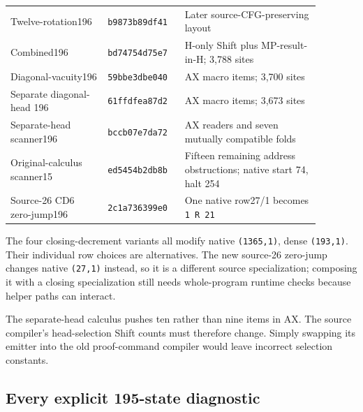 \begin{longtable}{@{}>{\raggedright\arraybackslash}p{0.29\linewidth}>{\raggedright\arraybackslash}p{0.2\linewidth}>{\raggedright\arraybackslash}p{0.39\linewidth}@{}}
Twelve-rotation196 & \nolinkurl{b9873b89df41} & Later source-CFG-preserving layout\\
Combined196 & \nolinkurl{bd74754d75e7} & H-only Shift plus MP-result-in-H; 3,788 sites\\
Diagonal-vacuity196 & \nolinkurl{59bbe3dbe040} & 191 AX macro items; 3,700 sites\\
Separate diagonal-head 196 & \nolinkurl{61ffdfea87d2} & 190 AX macro items; 3,673 sites\\
Separate-head scanner196 & \nolinkurl{bccb07e7da72} & 69 AX readers and seven mutually compatible folds\\
Original-calculus scanner15 & \nolinkurl{ed5454b2db8b} & Fifteen remaining address obstructions; native start 74, halt 254\\
Source-26 CD6 zero-jump196 & \nolinkurl{2c1a736399e0} & One native row27/1 becomes \nolinkurl{1 R 21}\\
\end{longtable}
\endgroup

The four closing-decrement variants all modify native \nolinkurl{(1365,1)}, dense
\nolinkurl{(193,1)}. Their individual row choices are alternatives. The new
source-26 zero-jump changes native \nolinkurl{(27,1)} instead, so it is a different
source specialization; composing it with a closing specialization still
needs whole-program runtime checks because helper paths can interact.

The separate-head calculus pushes ten rather than nine items in AX. The
source compiler's head-selection Shift counts must therefore change.
Simply swapping its emitter into the old proof-command compiler would
leave incorrect selection constants.

\subsection{Every explicit 195-state diagnostic}

